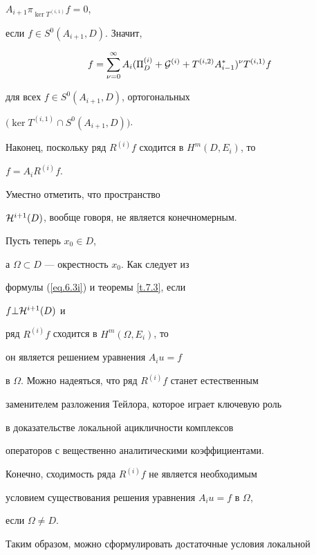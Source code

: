 \begin{pf}
$A_{i+1} \pi_{\ker T^{(i,1)}} f=0$,


если $f \in S^0 (A_{i+1}, D)$. Значит,


$$


f=\sum_{\nu=0}^{\infty} A_i (\Pi ^{(i)}_{D} +


{\cal G}^{(i)} +T^{(i,2)} A^*_{i-1})^{\nu} T^{(i,1)} f


$$


для всех $f \in S^0 (A_{i+1}, D)$, ортогональных


$ \big(\ker T^{(i,1)} \cap S^0 (A_{i+1}, D)\big)$.


Наконец, поскольку ряд $R^{(i)}f$ сходится в $H^{m} (D, E_i)$, то


$f=A_i R^{(i)}f$.


\end{pf}  %








Уместно отметить, что пространство


${\cal H}^{i+1} (D)$, вообще говоря, не является конечномерным.





Пусть теперь $x_0 \in D$,


а $\Omega \subset D$ --- окрестность $x_0$. Как следует из


формулы (\ref{eq.6.3i}) и теоремы \ref{t.7.3}, если


$f \bot {\cal H} ^{i+1} (D)$ и


ряд $R^{(i)}f$ сходится в $H^m (\Omega,E_i)$, то


он является решением уравнения $A_iu=f$


в $\Omega$. Можно надеяться, что ряд $R^{(i)}f$ станет естественным


заменителем разложения Тейлора, которое играет ключевую роль


в доказательстве локальной ацикличности комплексов


операторов с вещественно аналитическими коэффициентами.


Конечно, сходимость ряда $R^{(i)}f$ не является необходимым


условием существования решения уравнения $A_iu=f$ в $\Omega$,


если $\Omega \ne D$.





Таким образом, можно сформулировать достаточные условия локальной


